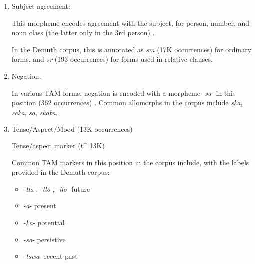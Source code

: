 \documentclass[11pt,letterpaper]{article}
\begin{document}
\begin{enumerate}
    \item Subject agreement: 
    
    This morpheme encodes agreement with the subject, for person, number, and noun class (the latter only in the 3rd person) \cite[]{doke1967textbook} \cite[p. 162]{guma1971outline}.
    
    In the Demuth corpus, this is annotated as \textit{sm} (17K occurrences) for ordinary forms, and \textit{sr} (193 occurrences) for forms used in relative clauses.

   
    
    \item Negation:
    
    In various TAM forms, negation is encoded with a morpheme -\textit{sa}- in this position (362 occurrences) \cite[p. 172]{guma1971outline} \cite[]{doke1967textbook}.
    Common allomorphs in the corpus include \textit{ska}, \textit{seka}, \textit{sa}, \textit{skaba}.
    
    
    
    \item Tense/Aspect/Mood (13K occurrences)
    
    Tense/aspect marker (t\^{} 13K) \cite[p. 165]{guma1971outline}
    
    Common TAM markers in this position in the corpus include, with the labels provided in the Demuth corpus:
    
    \begin{itemize}
    \item -\textit{tla}-, -\textit{tlo}-, -\textit{ilo}- future \cite[--412]{doke1967textbook}
    \item -\textit{a}- present \cite[]{doke1967textbook}
    \item -\textit{ka}- potential \cite[--428]{doke1967textbook}
    \item -\textit{sa}- persistive \cite[--418]{doke1967textbook}
    \item -\textit{tswa}- recent past \cite[--406]{doke1967textbook} 
    

\end{itemize}
\end{enumerate}
\end{document}
